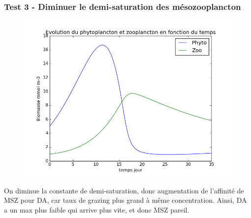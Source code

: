 {\subsubsection{Test 3 - Diminuer le demi-saturation des mésozooplancton}
\begin{figure}
  \includegraphics[width=\textwidth]{partie1/test3x35.png}
  \caption{\todo}
  \label{fig:partie1t3}
\end{figure}
\par{
On diminue la constante de demi-saturation, donc augmentation de l'affinité de MSZ pour DA, car taux de
grazing plus grand à même concentration. Ainsi, DA a un max plus faible qui arrive plus vite, et donc
MSZ pareil.
}
\FloatBarrier

\clearpage
}
